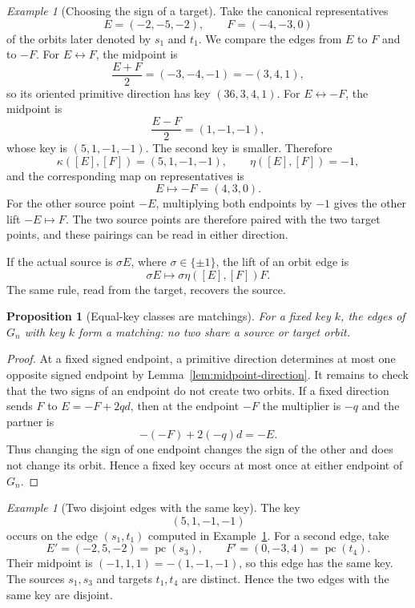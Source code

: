 \documentclass[11pt]{amsart}
\newtheorem{proposition}[theorem]{Proposition}
\theoremstyle{definition}
\theoremstyle{remark}
\newtheorem{example}[theorem]{Example}
\newcommand{\pc}{\operatorname{pc}}
\begin{document}
\begin{example}[Choosing the sign of a target]
\label{ex:signed-orbit-41}
Take the canonical representatives
\[
 E=(-2,-5,-2),
 \qquad
 F=(-4,-3,0)
\]
of the orbits later denoted by $s_1$ and $t_1$.  We compare the edges from
$E$ to $F$ and to $-F$.  For $E\leftrightarrow F$, the midpoint is
\[
 \frac{E+F}{2}=(-3,-4,-1)=-(3,4,1),
\]
so its oriented primitive direction has key $(36,3,4,1)$.  For
$E\leftrightarrow -F$, the midpoint is
\[
 \frac{E-F}{2}=(1,-1,-1),
\]
whose key is $(5,1,-1,-1)$.  The second key is smaller.  Therefore
\[
 \kappa([E],[F])=(5,1,-1,-1),
 \qquad
 \eta([E],[F])=-1,
\]
and the corresponding map on representatives is
\[
 E\longmapsto-F=(4,3,0).
\]
For the other source point $-E$, multiplying both endpoints by $-1$ gives the
other lift $-E\mapsto F$.  The two source points are therefore paired with
the two target points, and these pairings can be read in either direction.
\end{example}

If the actual source is $\sigma E$, where $\sigma\in\{\pm1\}$, the lift of an
orbit edge is
\begin{equation}\label{eq:sign-lift}
 \sigma E\longmapsto \sigma\eta([E],[F])F.
\end{equation}
The same rule, read from the target, recovers the source.

\begin{proposition}[Equal-key classes are matchings]
\label{prop:key-class-matching}
For a fixed key $k$, the edges of $G_n$ with key $k$ form a matching: no two
share a source or target orbit.
\end{proposition}

\begin{proof}
At a fixed signed endpoint, a primitive direction determines at most one
opposite signed endpoint by Lemma~\ref{lem:midpoint-direction}.  It remains to
check that the two signs of an endpoint do not create two orbits.  If a fixed
direction sends $F$ to $E=-F+2qd$, then at the endpoint $-F$ the multiplier is
$-q$ and the partner is
\[
 -(-F)+2(-q)d=-E.
\]
Thus changing the sign of one endpoint changes the sign of the other and does
not change its orbit.  Hence a fixed key occurs at most once at either
endpoint of $G_n$.
\end{proof}

\begin{example}[Two disjoint edges with the same key]
\label{ex:equal-key-41}
The key
\[
 (5,1,-1,-1)
\]
occurs on the edge $(s_1,t_1)$ computed in
Example~\ref{ex:signed-orbit-41}.  For a second edge, take
\[
 E'=(-2,5,-2)=\pc(s_3),
 \qquad
 F'=(0,-3,4)=\pc(t_4).
\]
Their midpoint is $(-1,1,1)=-(1,-1,-1)$, so this edge has the same key.
The sources $s_1,s_3$ and targets $t_1,t_4$ are distinct.  Hence the two
edges with the same key are disjoint.
\end{example}
\end{document}
